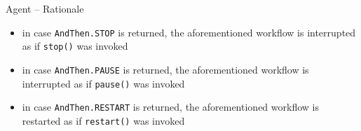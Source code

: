 \documentclass[presentation]{beamer}\mode<presentation>{\usetheme{AMSCesenaPurpleAndGold}}
\begin{document}
\begin{frame}[allowframebreaks]{Agent -- Rationale}
\begin{itemize}
\begin{itemize}
            \item in case \texttt{AndThen.\alert{STOP}} is returned, the aforementioned workflow is interrupted as if \texttt{stop()} was invoked
            
            \item in case \texttt{AndThen.\alert{PAUSE}} is returned, the aforementioned workflow is interrupted as if \texttt{pause()} was invoked
            
            \item in case \texttt{AndThen.\alert{RESTART}} is returned, the aforementioned workflow is restarted as if \texttt{restart()} was invoked
        \end{itemize}
        
        
    \end{itemize}
    
    
\end{frame}
\end{document}

